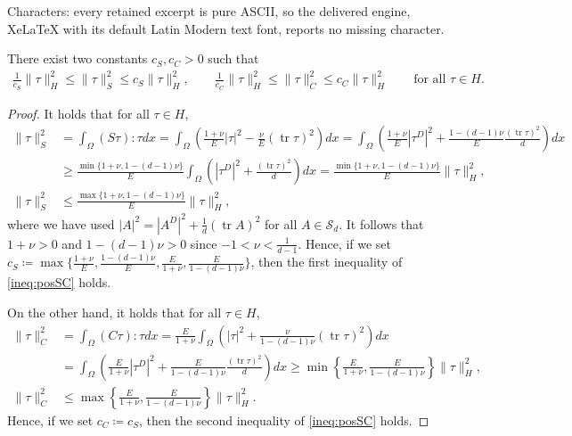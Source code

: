 \documentclass[10pt,a4paper]{amsart}
\newcommand{\Hs}{{H}}
\newcommand{\Sym}{{\mathcal S}}
\newcommand{\defeq}{\coloneqq}
\newcommand{\into}{\int_\Omega}
\newcommand{\tr}{\operatorname{tr}}
\begin{document}
Characters: every retained excerpt is pure ASCII, so the delivered engine, XeLaTeX with its default Latin Modern text font, reports no missing character.
\begin{Lem}\label{Lem:posSC}
    There exist two constants $c_S, c_C > 0$ such that 
    \begin{align}\label{ineq:posSC}
        \frac{1}{c_S}\|\tau\|_\Hs^2 \le \|\tau\|_S^2 \le c_S\|\tau\|_\Hs^2,\qquad
        \frac{1}{c_C}\|\tau\|_\Hs^2 \le \|\tau\|_C^2 \le c_C\|\tau\|_\Hs^2
        \qquad\mbox{for all }\tau\in\Hs.
    \end{align}
\end{Lem}

\begin{proof}
    It holds that for all $\tau\in\Hs$, 
    \begin{align*}
        \|\tau\|_S^2
        &= \into (S\tau):\tau dx 
        = \into \left(\frac{1+\nu}{E}|\tau|^2 - \frac{\nu}{E}(\tr \tau)^2\right) dx
        = \into \left(\frac{1+\nu}{E}|\tau^D|^2 + \frac{1-(d-1)\nu}{E}\frac{(\tr \tau)^2}{d}\right) dx\\
        &\ge \frac{\min\{1+\nu,1-(d-1)\nu\}}{E}\into \left(|\tau^D|^2 + \frac{(\tr \tau)^2}{d}\right) dx
        = \frac{\min\{1+\nu,1-(d-1)\nu\}}{E}\|\tau\|_\Hs^2,\\
        \|\tau\|_S^2
        &\le \frac{\max\{1+\nu,1-(d-1)\nu\}}{E}\|\tau\|_\Hs^2,
    \end{align*}
    where we have used $|A|^2 = |A^D|^2 + \frac{1}{d}(\tr A)^2$ for all $A\in\Sym_d$.
    It follows that $1+\nu > 0$ and $1-(d-1)\nu > 0$ since $-1<\nu<\frac{1}{d-1}$. Hence, if we set $c_S\defeq\max\{\frac{1+\nu}{E}, \frac{1-(d-1)\nu}{E}, \frac{E}{1+\nu}, \frac{E}{1-(d-1)\nu}\}$, then the first inequality of \eqref{ineq:posSC} holds.

    On the other hand, it holds that for all $\tau\in\Hs$,
    \begin{align*}
        \|\tau\|_C^2
        &= \into (C\tau):\tau dx 
        = \frac{E}{1+\nu}\into \left(|\tau|^2 + \frac{\nu}{1-(d-1)\nu}(\tr \tau)^2\right) dx \\ 
        &= \into \left(\frac{E}{1+\nu}|\tau^D|^2 + \frac{E}{1-(d-1)\nu}\frac{(\tr \tau)^2}{d}\right) dx 
        \ge \min\left\{\frac{E}{1+\nu},\frac{E}{1-(d-1)\nu}\right\}\|\tau\|_\Hs^2,\\
        \|\tau\|_C^2
        &\le \max\left\{\frac{E}{1+\nu},\frac{E}{1-(d-1)\nu}\right\}\|\tau\|_\Hs^2.
    \end{align*}
    Hence, if we set $c_C\defeq c_S$, then the second inequality of \eqref{ineq:posSC} holds.
\end{proof}
\end{document}
